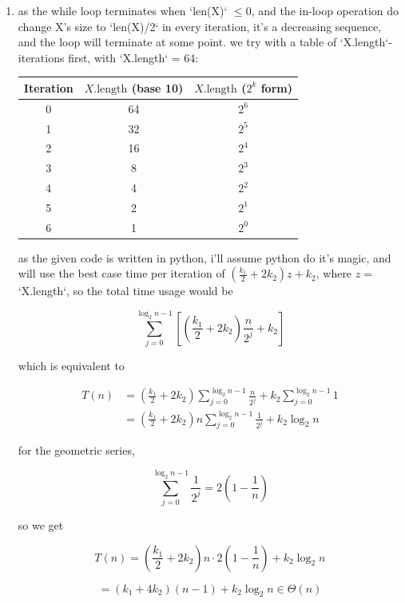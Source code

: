 \documentclass{article}
\theoremstyle{remark}
\begin{document}
\begin{enumerate}
    \medskip
    \begin{center}
    \rule{0.3\linewidth}{0.2pt}
    \end{center}
    \medskip


    \item as the while loop terminates when `len(X)` $\le 0$, and the in-loop operation do change X's size to `len(X)/2` in every iteration, it's a decreasing sequence, and the loop will terminate at some point. we try with a table of `X.length`-iterations first, with `X.length` = 64:

        \begin{center}
        \begin{tabular}{c|c|c}
        \textbf{Iteration} & \textbf{$X.\text{length}$ (base 10)} & \textbf{$X.\text{length}$ ($2^k$ form)} \\
        \hline
        0 & 64 & $2^6$ \\
        1 & 32 & $2^5$ \\
        2 & 16 & $2^4$ \\
        3 & 8  & $2^3$ \\
        4 & 4  & $2^2$ \\
        5 & 2  & $2^1$ \\
        6 & 1  & $2^0$ \\
        \end{tabular}
        \end{center}
        
        as the given code is written in python, i'll assume python do it's magic, and will use the best case time per iteration of $\left(\frac{k_1}{2} + 2k_2\right)z + k_2$, where $z = $ `X.length`, so the total time usage would be

        \[
        \sum_{j=0}^{\log_2 n - 1}
        \left[
        \left(\frac{k_1}{2} + 2k_2\right)\frac{n}{2^j} + k_2
        \right]
        \]

        which is equivalent to 

        \begin{align*}
        T(n)
        &= \left(\frac{k_1}{2} + 2k_2\right)
        \sum_{j=0}^{\log_2 n - 1} \frac{n}{2^j}
        + k_2 \sum_{j=0}^{\log_2 n - 1} 1 \\
        &= \left(\frac{k_1}{2} + 2k_2\right)
        n \sum_{j=0}^{\log_2 n - 1} \frac{1}{2^j}
        + k_2 \log_2 n
        \end{align*}

        for the geometric series,

        \[
        \sum_{j=0}^{\log_2 n - 1} \frac{1}{2^j}
        =
        2\left(1 - \frac{1}{n}\right)
        \]

        so we get

        \[
        T(n)
        =
        \left(\frac{k_1}{2} + 2k_2\right)
        n \cdot
        2\left(1 - \frac{1}{n}\right)
        + k_2 \log_2 n
        \]

        \[
        =
        (k_1 + 4k_2)(n - 1)
        + k_2 \log_2 n \in\boxed{\Theta(n)}
        \]

\end{enumerate}
\vspace{1em}
\hrulefill
\end{document}
